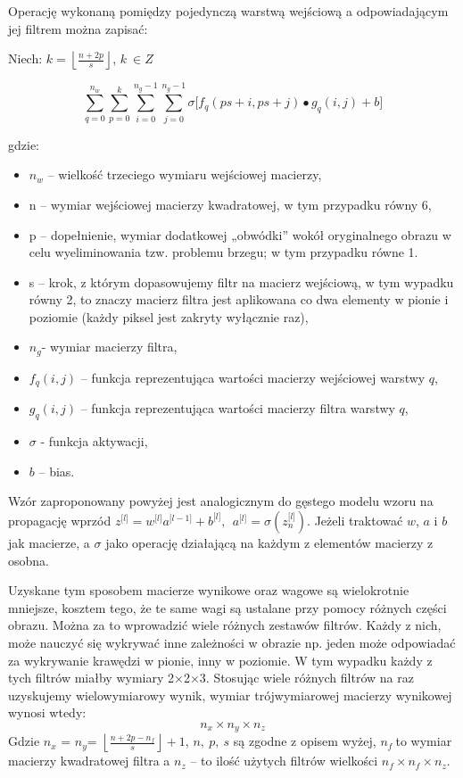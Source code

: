 Operację wykonaną pomiędzy pojedynczą warstwą wejściową a odpowiadającym jej filtrem można zapisać:

Niech: \(k = \left\lfloor \frac{n + 2p}{s} \right\rfloor\), \(k\ \in Z\)

\[\sum_{q = 0}^{n_{w}}{\sum_{p = 0}^{k}{\sum_{i = 0}^{n_{g} - 1}{\sum_{j = 0}^{n_{g} - 1}{\sigma\lbrack f_{q}\left( ps + i,ps + j \right) \bullet g_{q}\left( i,j \right) + b\rbrack}}}}\]

gdzie:

\begin{itemize}
\item
  \(n_{w}\) -- wielkość trzeciego wymiaru wejściowej macierzy,
\item
  n -- wymiar wejściowej macierzy kwadratowej, w tym przypadku równy 6,
\item
  p -- dopełnienie, wymiar dodatkowej „obwódki'' wokół oryginalnego
  obrazu w celu wyeliminowania tzw. problemu brzegu; w tym przypadku
  równe 1.
\item
  s -- krok, z którym dopasowujemy filtr na macierz wejściową, w tym
  wypadku równy 2, to znaczy macierz filtra jest aplikowana co dwa
  elementy w pionie i poziomie (każdy piksel jest zakryty wyłącznie
  raz),
\item
  \(n_{g}\)- wymiar macierzy filtra,
\item
  \(f_{q}(i,j)\) -- funkcja reprezentująca wartości macierzy wejściowej
  warstwy \(q\),
\item
  \(g_{q}(i,j)\) -- funkcja reprezentująca wartości macierzy filtra
  warstwy \(q\),
\item
  \(\sigma\) - funkcja aktywacji,
\item
  \(b\) -- bias.
\end{itemize}

Wzór zaproponowany powyżej jest analogicznym do gęstego modelu wzoru na
propagację wprzód \(z^{\lbrack l\rbrack} = w^{\lbrack l\rbrack}a^{\lbrack l - 1\rbrack} + b^{\lbrack l\rbrack},\ \ a^{\lbrack l\rbrack} = \sigma(z_{n}^{\lbrack l\rbrack})\). Jeżeli traktować \(w\), \(a\) i \(b\) jak macierze, a \(\sigma\) jako operację działającą na każdym z elementów macierzy z osobna.

Uzyskane tym sposobem macierze wynikowe oraz wagowe są wielokrotnie mniejsze, kosztem tego, że te same wagi są ustalane przy pomocy różnych części obrazu. Można za to wprowadzić wiele różnych zestawów filtrów. Każdy z nich, może nauczyć się wykrywać inne zależności w obrazie np. jeden może odpowiadać za wykrywanie krawędzi w pionie, inny w poziomie. W tym wypadku każdy z tych filtrów miałby wymiary 2\(\times\)2\(\times\)3. Stosując wiele różnych filtrów na raz uzyskujemy wielowymiarowy wynik,
wymiar trójwymiarowej macierzy wynikowej wynosi wtedy:
\[n_{x} \times n_{y} \times n_{z}\]
Gdzie \(n_{x}\) = ­­\(n_{y}\)=
\(\left\lfloor \frac{n + 2p - n_{f}}{s} \right\rfloor + 1\), \(n,\ p,\ s\)
są zgodne z opisem wyżej, \(n_{f}\ \)to wymiar macierzy kwadratowej
filtra a \(n_{z}\) -- to ilość użytych filtrów wielkości
\(n_{f} \times n_{f} \times n_{z}\).

